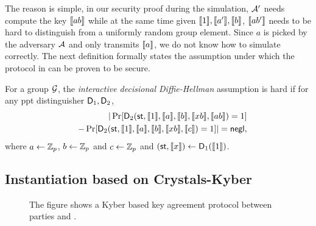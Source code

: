 The reason is simple, in our security proof during the simulation, $\mathcal{A}'$ needs compute the key $\llbracket ab \rrbracket$ while at the same time given $\llbracket 1\rrbracket,\llbracket a'\rrbracket,\llbracket b\rrbracket$, $\llbracket ab'\rrbracket$ needs to be hard to distinguish from a uniformly random group element. Since $a$ is picked by the adversary $\mathcal{A}$ and only transmits $\llbracket a \rrbracket$, we do not know how to simulate correctly. The next definition formally states the assumption under which the protocol in  can be proven to be secure. 

\begin{definition}\label{def:IDDH}
For a group $\mathcal{G}$, the \emph{interactive decisional Diffie-Hellman} assumption is hard if for any ppt distinguisher $\mathsf D_1,\mathsf D_2$,
\begin{eqnarray*}
&&|\Pr[ \mathsf D_2(\mathsf{st},\llbracket 1\rrbracket,\llbracket a\rrbracket,\llbracket b\rrbracket,\llbracket xb\rrbracket,\llbracket ab\rrbracket)=1]\\
&&-\Pr[ \mathsf D_2(\mathsf{st},\llbracket 1\rrbracket,\llbracket a\rrbracket,\llbracket b\rrbracket,\llbracket xb\rrbracket,\llbracket c\rrbracket)=1]|=\mathsf{negl},
\end{eqnarray*}
where $a\leftarrow\mathbb Z_p$, $b\leftarrow\mathbb Z_p$ and $c\leftarrow\mathbb Z_p$ and $(\mathsf{st},\llbracket x\rrbracket)\leftarrow\mathsf D_1(\llbracket 1\rrbracket)$.
\end{definition}









\subsection{Instantiation based on Crystals-Kyber}
 

\begin{figure}[h!]
\centering
{}
\label{fig:Kyber}
\caption{The figure shows a Kyber based key agreement protocol between parties \A and \B.}
\end{figure}


